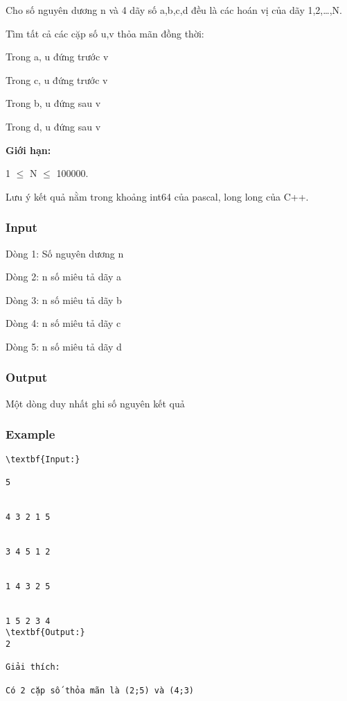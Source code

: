 



   Cho số nguyên dương n và 4 dãy số a,b,c,d đều là các hoán vị của dãy 1,2,…,N.  

   Tìm tất cả các cặp số u,v thỏa mãn đồng thời:  

   Trong a, u đứng trước v  

   Trong c, u đứng trước v  

   Trong b, u đứng sau v  

   Trong d, u đứng sau v  

\textbf{    Giới hạn:   }

   1  $\le$  N  $\le$  100000.  

   Lưu ý kết quả nằm trong khoảng int64 của pascal, long long của C++.  

\subsubsection{   Input  }

   Dòng 1: Số nguyên dương n  

   Dòng 2: n số miêu tả dãy a  

   Dòng 3: n số miêu tả dãy b  

   Dòng 4: n số miêu tả dãy c  

   Dòng 5: n số miêu tả dãy d  

\subsubsection{   Output  }

   Một dòng duy nhất ghi số nguyên kết quả  

\subsubsection{   Example  }
\begin{verbatim}
\textbf{Input:}

5


4 3 2 1 5


3 4 5 1 2


1 4 3 2 5


1 5 2 3 4
\textbf{Output:}
2

Giải thích: 

Có 2 cặp số thỏa mãn là (2;5) và (4;3)\end{verbatim}
